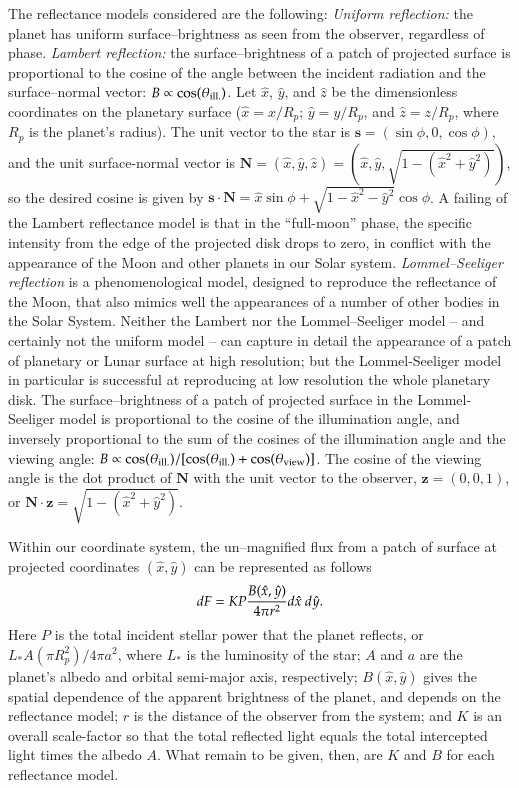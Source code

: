 The reflectance models considered are the following:
\noindent
{\it Uniform reflection:} the planet has uniform surface--brightness
as seen from the observer, regardless of phase.
%
{\it Lambert reflection:} the surface--brightness of a patch of
projected surface is proportional to the cosine of the angle between
the incident radiation and the surface--normal vector: $B \propto
\cos(\theta_{\rm{ill.}})$.  Let $\hat{x}$, $\hat{y}$, and $\hat{z}$ be the
dimensionless coordinates on the planetary surface ($\hat{x} = x/R_p$;
$\hat{y} = y/R_p$, and $\hat{z} = z/R_p$, where $R_p$ is the planet's radius).
The unit vector to the star is $\mathbf{s} = (\sin\phi,0,\cos\phi)$, and the
unit surface-normal vector is $\mathbf{N} = (\hat{x},\hat{y},\hat{z}) =
(\hat{x},\hat{y},\sqrt{1-(\hat{x}^2 + \hat{y}^2)})$, so the desired cosine
is given by $\mathbf{s} \cdot \mathbf{N} = \hat{x} \sin\phi +
\sqrt{1- \hat{x}^2 - \hat{y}^2}\cos\phi$.  A failing of the Lambert
reflectance model is that in the ``full-moon'' phase, the specific intensity
from the edge of the projected disk drops to zero, in conflict with the
appearance of the Moon and other planets in our Solar system.
%
{\it Lommel--Seeliger reflection} is a phenomenological model,
designed to reproduce the reflectance of the Moon, that also mimics
well the appearances of a number of other bodies in the Solar System.
Neither the Lambert nor the Lommel--Seeliger model -- and certainly
not the uniform model -- can capture in detail the appearance of a
patch of planetary or Lunar surface at high resolution; but the
Lommel-Seeliger model in particular is successful at reproducing at
low resolution the whole planetary disk.  The surface--brightness of a
patch of projected surface in the Lommel-Seeliger model is
proportional to the cosine of the illumination angle, and inversely
proportional to the sum of the cosines of the illumination angle and
the viewing angle: $B \propto
\cos(\theta_{\rm{ill.}})/[\cos(\theta_{\rm{ill.}}) +
\cos(\theta_{\rm{view}})]$.  The cosine of the viewing angle is the
dot product of $\mathbf{N}$ with the unit vector to the observer,
$\mathbf{z} = (0,0,1)$, or $\mathbf{N} \cdot \mathbf{z} = \sqrt{1 -
(\hat{x}^2 + \hat{y}^2)}$.

Within our coordinate system, the un--magnified flux from a patch of
surface at projected coordinates $(\hat{x},\hat{y})$ can be represented as
follows
\begin{equation}
dF = K P \frac{B(\hat{x}, \hat{y})}{4 \pi r^2} d\hat{x} \mbox{ } d\hat{y}.
\end{equation}
Here $P$ is the total incident stellar power that the planet reflects,
or $L_* A (\pi R_p^2)/4 \pi a^2$, where $L_*$ is the luminosity of the
star; $A$ and $a$ are the planet's albedo and orbital
semi-major axis, respectively; $B(\hat{x}, \hat{y})$ gives the spatial
dependence of the apparent brightness of the planet, and depends on
the reflectance model; $r$ is the distance of the observer from the
system; and $K$ is an overall scale-factor so that the total reflected
light equals the total intercepted light times the albedo $A$.  What
remain to be given, then, are $K$ and $B$ for each reflectance model.

